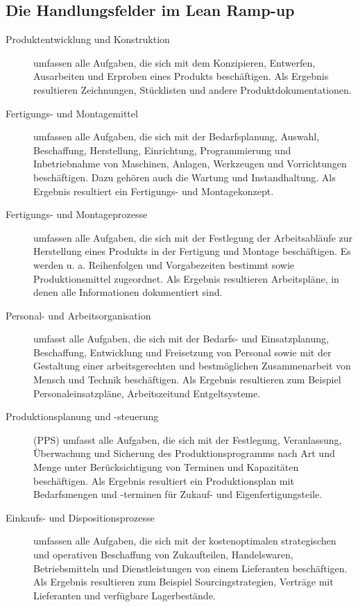 \subsection*{Die Handlungsfelder im Lean Ramp-up}\label{appendix:dom11a:hf}
\begin{description}

\item[Produktentwicklung und Konstruktion]
umfassen alle Aufgaben, die sich mit
dem Konzipieren, Entwerfen, Ausarbeiten und Erproben eines Produkts
beschäftigen. Als Ergebnis resultieren Zeichnungen, Stücklisten und andere Produktdokumentationen.

\item[Fertigungs- und Montagemittel] umfassen alle Aufgaben, die sich mit der Bedarfsplanung, Auswahl, Beschaffung,
Herstellung, Einrichtung, Programmierung und Inbetriebnahme von Maschinen, Anlagen, Werkzeugen und
Vorrichtungen beschäftigen. Dazu gehören auch die Wartung und Instandhaltung. Als Ergebnis resultiert ein
Fertigungs- und Montagekonzept.

\item[Fertigungs- und Montageprozesse] umfassen alle Aufgaben, die sich mit der
Festlegung der Arbeitsabläufe zur
Herstellung eines Produkts in der
Fertigung und Montage beschäftigen.
Es werden u. a. Reihenfolgen und
Vorgabezeiten bestimmt sowie Produktionsmittel zugeordnet. Als Ergebnis resultieren Arbeitspläne, in
denen alle Informationen dokumentiert sind.

\item[Personal- und Arbeitsorganisation] umfasst alle Aufgaben, die sich mit der
Bedarfs- und Einsatzplanung, Beschaffung, Entwicklung und Freisetzung von Personal sowie mit der Gestaltung einer arbeitsgerechten und
bestmöglichen Zusammenarbeit von
Mensch und Technik beschäftigen.
Als Ergebnis resultieren zum Beispiel
Personaleinsatzpläne,
 Arbeitszeitund Entgeltsysteme.

\item[Produktionsplanung und -steuerung]
(PPS) umfasst alle Aufgaben, die sich
mit der Festlegung, Veranlassung,
Überwachung und Sicherung des Produktionsprogramms nach Art und
Menge unter Berücksichtigung von
Terminen und Kapazitäten beschäftigen. Als Ergebnis resultiert ein Produktionsplan mit Bedarfsmengen und
-terminen für Zukauf- und Eigenfertigungsteile.

 \item[Einkaufs- und Dispositionsprozesse]
umfassen alle Aufgaben, die sich mit
der kostenoptimalen strategischen
und operativen Beschaffung von Zukaufteilen, Handelswaren, Betriebsmitteln und Dienstleistungen von einem Lieferanten beschäftigen. Als Ergebnis resultieren zum Beispiel Sourcingstrategien, Verträge mit Lieferanten und verfügbare Lagerbestände.



\end{description}
